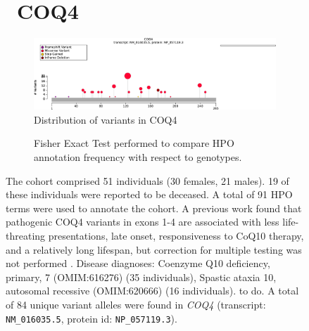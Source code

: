 \begin{figure}[htbp]
\section*{ COQ4}
\centering
\begin{subfigure}[b]{0.95\textwidth}
\centering
\includegraphics[width=\textwidth]{img/COQ4_protein_diagram.pdf} 
\captionsetup{justification=raggedright,singlelinecheck=false}
\caption{Distribution of variants in COQ4}
\end{subfigure}

\vspace{2em}

\begin{subfigure}[b]{0.95\textwidth}
\centering
{}
\captionsetup{justification=raggedright,singlelinecheck=false}
\caption{Fisher Exact Test performed to compare HPO annotation frequency with respect to genotypes. }
\end{subfigure}

\vspace{2em}

\caption{The cohort comprised 51 individuals (30 females, 21 males). 19 of these individuals were reported to be deceased. A total of 91 HPO terms were used to annotate the cohort. 
A previous work found that pathogenic COQ4 variants in exons 1-4 are associated with less life-threating presentations, late onset, responsiveness to CoQ10 therapy, and a relatively long lifespan,
but correction for multiple testing was not performed \cite{PMID_35154243}.
Disease diagnoses: Coenzyme Q10 deficiency, primary, 7 (OMIM:616276) (35 individuals), Spastic ataxia 10, autosomal recessive (OMIM:620666) (16 individuals). to do. A total of 84 unique variant alleles were found in \textit{COQ4} (transcript: \texttt{NM\_016035.5}, protein id: \texttt{NP\_057119.3}).}
\end{figure}
